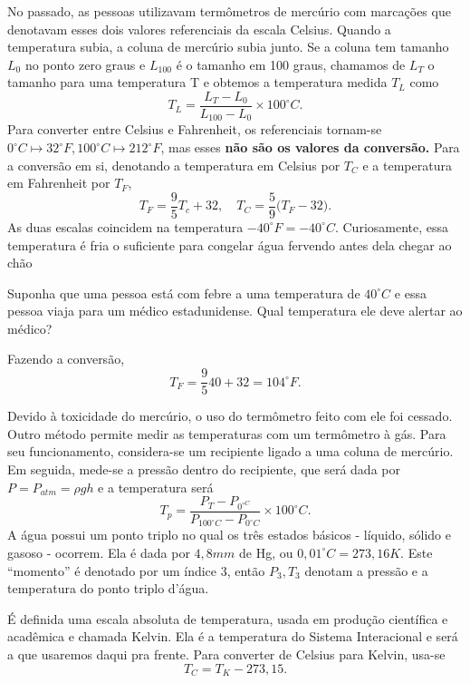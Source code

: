 \documentclass[PhysicsII/phsyicsII_notes.tex]{subfiles}
\begin{document}
No passado, as pessoas utilizavam termômetros de mercúrio com marcações que denotavam esses dois valores referenciais da escala Celsius. Quando a temperatura subia, a coluna
de mercúrio subia junto. Se a coluna tem tamanho \(L_{0}\) no ponto zero graus e \(L_{100}\) é o tamanho em 100 graus, chamamos de \(L_{T}\) o tamanho para uma temperatura T e obtemos a
temperatura medida \(T_{L}\) como
\[
	T_{L} = \frac{L_{T} - L_{0}}{L_{100}-L_{0}}\times 100^{\circ{}}C.
\]
Para converter entre Celsius e Fahrenheit, os referenciais tornam-se \(0^{\circ{}}C\mapsto 32^{\circ{}}F, 100^{\circ{}}C\mapsto 212^{\circ{}}F\), mas esses \textbf{não são os valores da conversão.}
Para a conversão em si, denotando a temperatura em Celsius por \(T_{C}\) e a temperatura em Fahrenheit por \(T_{F}\),
\[
	T_{F} = \frac{9}{5}T_{c} + 32,\quad T_{C} = \frac{5}{9}\biggl(T_{F}-32\biggr).
\]
As duas escalas coincidem na temperatura \(-40^{\circ{}}F = -40^{\circ{}}C\). Curiosamente, essa temperatura é fria o suficiente para congelar água fervendo antes dela chegar ao chão
\begin{example}
	Suponha que uma pessoa está com febre a uma temperatura de \(40^{\circ{}}C\) e essa pessoa viaja para um médico estadunidense. Qual temperatura ele deve alertar ao médico?

	Fazendo a conversão,
	\[
		T_{F} = \frac{9}{5}40 +32 = 104^{\circ{}}F.
	\]
\end{example}
Devido à toxicidade do mercúrio, o uso do termômetro feito com ele foi cessado. Outro método permite medir as temperaturas com um termômetro à gás. Para seu funcionamento,
considera-se um recipiente ligado a uma coluna de mercúrio. Em seguida, mede-se a pressão dentro do recipiente, que será dada por \(P = P_{atm} = \rho gh\) e a temperatura será
\[
	T_{p} = \frac{P_{T} - P_{0^{\circ{}C}}}{P_{100^{\circ{}}C}-P_{0^{\circ{}}C}}\times 100^{\circ{}}C.
\]
A água possui um ponto triplo no qual os três estados básicos - líquido, sólido e gasoso - ocorrem. Ela é dada por \(4,8mm\) de Hg, ou \(0,01^{\circ{}}C = 273,16K\).
Este ``momento'' é denotado por um índice 3, então \(P_{3}, T_{3}\) denotam a pressão e a temperatura do ponto triplo d'água.

É definida uma escala absoluta de temperatura, usada em produção científica e acadêmica e chamada Kelvin. Ela é a temperatura do Sistema Interacional e será a que usaremos
daqui pra frente. Para converter de Celsius para Kelvin, usa-se
\[
	T_{C} = T_{K} - 273,15.
\]
\end{document}
